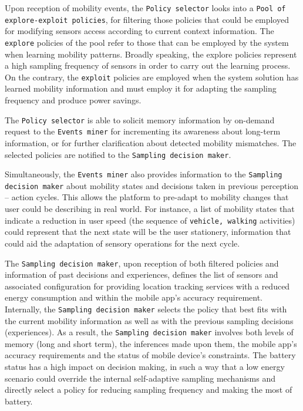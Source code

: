 \documentclass[ENG,PhD]{cinvestav}
\begin{document}
Upon reception of mobility events, the \texttt{Policy selector} looks into a \texttt{Pool of explore-exploit policies}, for filtering those policies that could be employed for modifying sensors access according to current context information.
The \texttt{explore} policies of the pool refer to those that can be employed by the system when learning mobility patterns. 
Broadly speaking, the explore policies represent a high sampling frequency of sensors in order to carry out the learning process.
On the contrary, the \texttt{exploit} policies are employed when the system solution has learned mobility information and must employ it for adapting the sampling frequency and produce power savings.

The \texttt{Policy selector} is able to solicit memory information by on-demand request to the \texttt{Events miner} for incrementing its awareness about long-term information, or for further clarification about detected mobility mismatches.
The selected policies are notified to the \texttt{Sampling decision maker}.

Simultaneously, the \texttt{Events miner} also provides information to the \texttt{Sampling decision maker} about mobility states and decisions taken in previous perception -- action cycles.
This allows the platform to pre-adapt to mobility changes that user could be describing in real world\cite{Haykin2014}.
For instance, a list of mobility states that indicate a reduction in user speed (the sequence of \texttt{vehicle, walking} activities) could represent that the next state will be the user stationery, information that could aid the adaptation of sensory operations for the next cycle.

The \texttt{Sampling decision maker}, upon reception of both filtered policies and information of past decisions and experiences, defines the list of sensors and associated configuration for providing location tracking services with a reduced energy consumption and within the mobile app's accuracy requirement.
Internally, the \texttt{Sampling decision maker} selects the policy that best fits with the current mobility information as well as with the previous sampling decisions (experiences).
As a result, the \texttt{Sampling decision maker} involves both levels of memory (long and short term), the inferences made upon them, the mobile app's accuracy requirements and the status of mobile device's constraints.
The battery status has a high impact on decision making, in such a way that a low energy scenario could override the internal self-adaptive sampling mechanisms and directly select a policy for reducing sampling frequency and making the most of battery.
\end{document}
